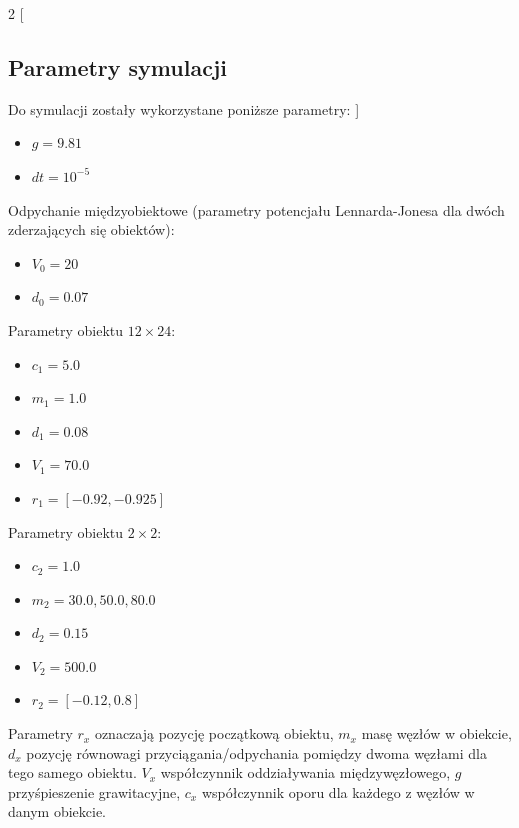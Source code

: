 \documentclass[12pt, letterpaper]{report}
\begin{document}
    \begin{multicols}{2}
        [
            \subsection{Parametry symulacji}
            Do symulacji zostały wykorzystane poniższe parametry:
        ]

        \begin{itemize}
            \item $g = 9.81$
            \item $dt = 10^{-5}$
        \end{itemize}
        Odpychanie międzyobiektowe (parametry potencjału Lennarda-Jonesa dla dwóch zderzających się obiektów):
        \begin{itemize}
            \item $V_{0} = 20$
            \item $d_{0} = 0.07$
        \end{itemize}
        Parametry obiektu $12 \times 24$:
        \begin{itemize}
            \item $c_{1} = 5.0$
            \item $m_{1} = 1.0$
            \item $d_{1} = 0.08$
            \item $V_{1} = 70.0$
            \item $r_{1} = [-0.92, -0.925]$
        \end{itemize}
        Parametry obiektu $2 \times 2$:
        \begin{itemize}
            \item $c_{2} = 1.0$
            \item $m_{2} = 30.0, 50.0, 80.0$
            \item $d_{2} = 0.15$
            \item $V_{2} = 500.0$
            \item $r_{2} = [-0.12, 0.8]$
        \end{itemize}
    \end{multicols}

    Parametry $r_x$ oznaczają pozycję początkową obiektu, $m_x$ masę węzłów w obiekcie, 
    $d_x$ pozycję równowagi przyciągania/odpychania pomiędzy dwoma węzłami dla tego
    samego obiektu.
    $V_x$ współczynnik oddziaływania międzywęzłowego, $g$ przyśpieszenie grawitacyjne, 
    $c_x$ współczynnik oporu dla każdego z węzłów w danym obiekcie.
\end{document}
